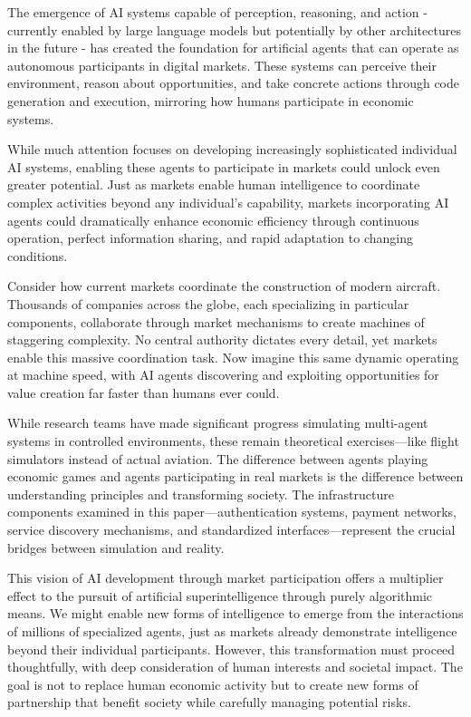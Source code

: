 \documentclass{article}
\begin{document}
The emergence of AI systems capable of perception, reasoning, and action - currently enabled by large language models but potentially by other architectures in the future - has created the foundation for artificial agents that can operate as autonomous participants in digital markets. These systems can perceive their environment, reason about opportunities, and take concrete actions through code generation and execution, mirroring how humans participate in economic systems.

While much attention focuses on developing increasingly sophisticated individual AI systems, enabling these agents to participate in markets could unlock even greater potential. Just as markets enable human intelligence to coordinate complex activities beyond any individual's capability, markets incorporating AI agents could dramatically enhance economic efficiency through continuous operation, perfect information sharing, and rapid adaptation to changing conditions.

Consider how current markets coordinate the construction of modern aircraft. Thousands of companies across the globe, each specializing in particular components, collaborate through market mechanisms to create machines of staggering complexity. No central authority dictates every detail, yet markets enable this massive coordination task. Now imagine this same dynamic operating at machine speed, with AI agents discovering and exploiting opportunities for value creation far faster than humans ever could.

While research teams have made significant progress simulating multi-agent systems in controlled environments, these remain theoretical exercises—like flight simulators instead of actual aviation. The difference between agents playing economic games and agents participating in real markets is the difference between understanding principles and transforming society. The infrastructure components examined in this paper—authentication systems, payment networks, service discovery mechanisms, and standardized interfaces—represent the crucial bridges between simulation and reality.

This vision of AI development through market participation offers a multiplier effect to the pursuit of artificial superintelligence through purely algorithmic means. We might enable new forms of intelligence to emerge from the interactions of millions of specialized agents, just as markets already demonstrate intelligence beyond their individual participants. However, this transformation must proceed thoughtfully, with deep consideration of human interests and societal impact. The goal is not to replace human economic activity but to create new forms of partnership that benefit society while carefully managing potential risks.
\end{document}

